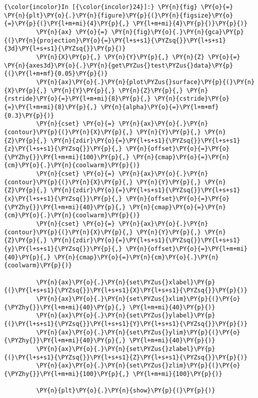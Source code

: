     \begin{Verbatim}[commandchars=\\\{\}]
{\color{incolor}In [{\color{incolor}24}]:} \PY{n}{fig} \PY{o}{=} \PY{n}{plt}\PY{o}{.}\PY{n}{figure}\PY{p}{(}\PY{n}{figsize}\PY{o}{=}\PY{p}{(}\PY{l+m+mi}{4}\PY{p}{,} \PY{l+m+mi}{4}\PY{p}{)}\PY{p}{)}
         \PY{n}{ax} \PY{o}{=} \PY{n}{fig}\PY{o}{.}\PY{n}{gca}\PY{p}{(}\PY{n}{projection}\PY{o}{=}\PY{l+s+s1}{\PYZsq{}}\PY{l+s+s1}{3d}\PY{l+s+s1}{\PYZsq{}}\PY{p}{)}
         \PY{n}{X}\PY{p}{,} \PY{n}{Y}\PY{p}{,} \PY{n}{Z} \PY{o}{=} \PY{n}{axes3d}\PY{o}{.}\PY{n}{get\PYZus{}test\PYZus{}data}\PY{p}{(}\PY{l+m+mf}{0.05}\PY{p}{)}
         \PY{n}{ax}\PY{o}{.}\PY{n}{plot\PYZus{}surface}\PY{p}{(}\PY{n}{X}\PY{p}{,} \PY{n}{Y}\PY{p}{,} \PY{n}{Z}\PY{p}{,} \PY{n}{rstride}\PY{o}{=}\PY{l+m+mi}{8}\PY{p}{,} \PY{n}{cstride}\PY{o}{=}\PY{l+m+mi}{8}\PY{p}{,} \PY{n}{alpha}\PY{o}{=}\PY{l+m+mf}{0.3}\PY{p}{)}
         \PY{n}{cset} \PY{o}{=} \PY{n}{ax}\PY{o}{.}\PY{n}{contour}\PY{p}{(}\PY{n}{X}\PY{p}{,} \PY{n}{Y}\PY{p}{,} \PY{n}{Z}\PY{p}{,} \PY{n}{zdir}\PY{o}{=}\PY{l+s+s1}{\PYZsq{}}\PY{l+s+s1}{z}\PY{l+s+s1}{\PYZsq{}}\PY{p}{,} \PY{n}{offset}\PY{o}{=}\PY{o}{\PYZhy{}}\PY{l+m+mi}{100}\PY{p}{,} \PY{n}{cmap}\PY{o}{=}\PY{n}{cm}\PY{o}{.}\PY{n}{coolwarm}\PY{p}{)}
         \PY{n}{cset} \PY{o}{=} \PY{n}{ax}\PY{o}{.}\PY{n}{contour}\PY{p}{(}\PY{n}{X}\PY{p}{,} \PY{n}{Y}\PY{p}{,} \PY{n}{Z}\PY{p}{,} \PY{n}{zdir}\PY{o}{=}\PY{l+s+s1}{\PYZsq{}}\PY{l+s+s1}{x}\PY{l+s+s1}{\PYZsq{}}\PY{p}{,} \PY{n}{offset}\PY{o}{=}\PY{o}{\PYZhy{}}\PY{l+m+mi}{40}\PY{p}{,} \PY{n}{cmap}\PY{o}{=}\PY{n}{cm}\PY{o}{.}\PY{n}{coolwarm}\PY{p}{)}
         \PY{n}{cset} \PY{o}{=} \PY{n}{ax}\PY{o}{.}\PY{n}{contour}\PY{p}{(}\PY{n}{X}\PY{p}{,} \PY{n}{Y}\PY{p}{,} \PY{n}{Z}\PY{p}{,} \PY{n}{zdir}\PY{o}{=}\PY{l+s+s1}{\PYZsq{}}\PY{l+s+s1}{y}\PY{l+s+s1}{\PYZsq{}}\PY{p}{,} \PY{n}{offset}\PY{o}{=}\PY{l+m+mi}{40}\PY{p}{,} \PY{n}{cmap}\PY{o}{=}\PY{n}{cm}\PY{o}{.}\PY{n}{coolwarm}\PY{p}{)}
         
         \PY{n}{ax}\PY{o}{.}\PY{n}{set\PYZus{}xlabel}\PY{p}{(}\PY{l+s+s1}{\PYZsq{}}\PY{l+s+s1}{X}\PY{l+s+s1}{\PYZsq{}}\PY{p}{)}
         \PY{n}{ax}\PY{o}{.}\PY{n}{set\PYZus{}xlim}\PY{p}{(}\PY{o}{\PYZhy{}}\PY{l+m+mi}{40}\PY{p}{,} \PY{l+m+mi}{40}\PY{p}{)}
         \PY{n}{ax}\PY{o}{.}\PY{n}{set\PYZus{}ylabel}\PY{p}{(}\PY{l+s+s1}{\PYZsq{}}\PY{l+s+s1}{Y}\PY{l+s+s1}{\PYZsq{}}\PY{p}{)}
         \PY{n}{ax}\PY{o}{.}\PY{n}{set\PYZus{}ylim}\PY{p}{(}\PY{o}{\PYZhy{}}\PY{l+m+mi}{40}\PY{p}{,} \PY{l+m+mi}{40}\PY{p}{)}
         \PY{n}{ax}\PY{o}{.}\PY{n}{set\PYZus{}zlabel}\PY{p}{(}\PY{l+s+s1}{\PYZsq{}}\PY{l+s+s1}{Z}\PY{l+s+s1}{\PYZsq{}}\PY{p}{)}
         \PY{n}{ax}\PY{o}{.}\PY{n}{set\PYZus{}zlim}\PY{p}{(}\PY{o}{\PYZhy{}}\PY{l+m+mi}{100}\PY{p}{,} \PY{l+m+mi}{100}\PY{p}{)}
         
         \PY{n}{plt}\PY{o}{.}\PY{n}{show}\PY{p}{(}\PY{p}{)}
\end{Verbatim}


